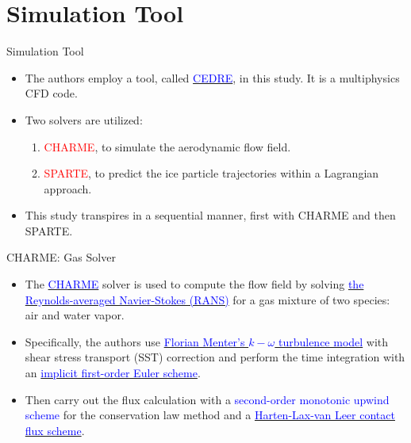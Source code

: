 \documentclass[aspectratio=169,xcolor=dvipsnames]{beamer}
\begin{document}
\section{Simulation Tool}

\begin{frame}{Simulation Tool}
    \begin{itemize}
        \item The authors employ a tool, called \href{https://aerospacelab.onera.fr/CEDRE-Software}{\textcolor{blue}{CEDRE}}, in this study. It is a multiphysics CFD code. 
        \item Two solvers are utilized:
        \begin{enumerate}
            \item \textcolor{red}{CHARME}, to simulate the aerodynamic flow field.
            \item \textcolor{red}{SPARTE}, to predict the ice particle trajectories within a Lagrangian approach. 
        \end{enumerate}
        \item This study transpires in a sequential manner, first with CHARME and then SPARTE. 
    \end{itemize}
\end{frame}


\begin{frame}{CHARME: Gas Solver}
    \begin{itemize}
        \item The \href{https://aerospacelab.onera.fr/Models-Turbulent-Combustion-in-CHARME-Solver-CEDRE}{\textcolor{blue}{CHARME}} solver is used to compute the flow field by solving \href{https://resources.system-analysis.cadence.com/blog/msa2021-the-reynolds-averaged-navier-stokes-rans-equations-and-models}{\textcolor{blue}{the Reynolds-averaged Navier-Stokes (RANS)}} for a gas mixture of two species: air and water vapor. 
        \item Specifically, the authors use \href{https://turbmodels.larc.nasa.gov/sst.html}{\textcolor{blue}{Florian Menter's $k-\omega$ turbulence model}} with shear stress transport (SST) correction and perform the time integration with an \href{https://en.wikipedia.org/wiki/Backward_Euler_method}{\textcolor{blue}{implicit first-order Euler scheme}}. 
        \item Then carry out the flux calculation with a \textcolor{blue}{second-order monotonic upwind scheme} for the conservation law method and a \href{https://ui.adsabs.harvard.edu/abs/2019ShWav..29.1065T/abstract}{\textcolor{blue}{Harten-Lax-van Leer contact flux scheme}}. 
    \end{itemize}
\end{frame}
\end{document}
